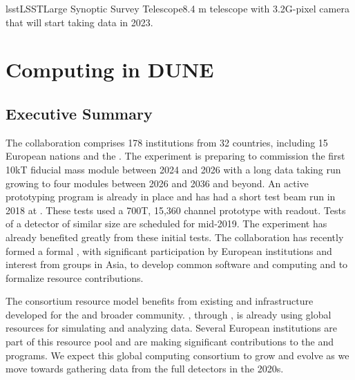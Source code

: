 \newcommand{\ldshort}[1]{{\bf{[#1]}}\todo{define abbr #1}}
\newcommand{\lcite}[1]{\cite{#1}}
\newcommand{\ignore}[1]

\newduneabbrev{lsst}{LSST}{Large Synoptic Survey Telescope}{8.4 m telescope with 3.2G-pixel camera that will start taking data in 2023.}

\chapter{Computing in DUNE}
\label{ch:exec-comp}

\section{Executive Summary}
\label{ch:exec-comp-es}

The   collaboration comprises 178 institutions from 32 countries, including 15 European nations and the . The experiment is preparing to commission the first 10kT  fiducial mass   module between 2024 and 2026 with a long data taking run growing to four modules between 2026 and 2036 and beyond.  An active prototyping program is already in place and has had  a short test beam run in 2018 at .  These tests used  a 700T, 15,360 channel prototype  with  readout.  Tests of a  detector of similar size are scheduled for mid-2019.   The  experiment has already  benefited greatly from these initial tests.  The collaboration has recently formed a formal , with significant participation by European institutions and interest from groups in Asia, to develop common software and computing and to formalize resource contributions.

The consortium resource model benefits from existing   and  infrastructure developed for the  and broader  community.  , through  , is already using global resources for simulating and analyzing   data.  Several European institutions are part of this resource pool and are making significant contributions to the  and  programs.  We expect this global computing consortium to grow and evolve as we move towards gathering data from the full  detectors in the 2020s.


